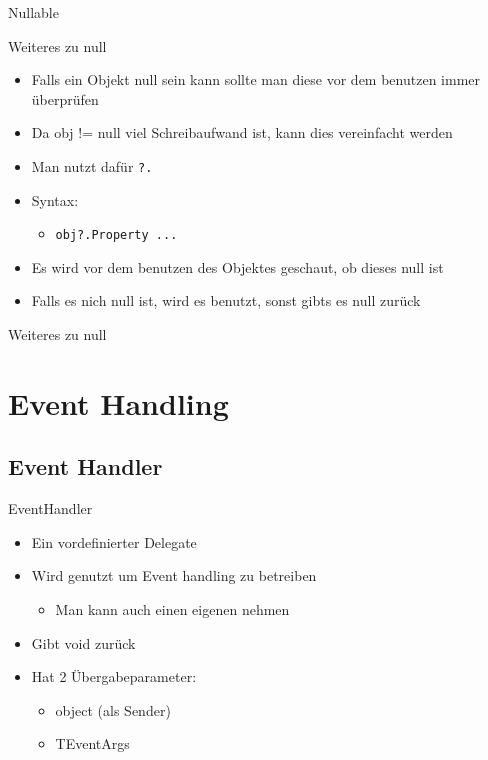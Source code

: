 \begin{frame}{Nullable}
		
\end{frame}

\begin{frame}{Weiteres zu null}
	\begin{itemize}
		\item Falls ein Objekt \alert{null} sein kann sollte man diese vor dem benutzen immer überprüfen
		\item Da \alert{obj != null} viel Schreibaufwand ist, kann dies vereinfacht werden	
	\end{itemize}
	\begin{itemize}
		\item Man nutzt dafür \texttt{\alert{?.}}
		\item Syntax:
		\begin{itemize}
			\item \texttt{obj\alert{?.}Property ...}
		\end{itemize}
		\item Es wird vor dem benutzen des Objektes geschaut, ob dieses \alert{null} ist
		\item Falls es nich \alert{null} ist, wird es benutzt, sonst gibts es \alert{null} zurück
	\end{itemize}
\end{frame}

\begin{frame}{Weiteres zu null}
		
		
\end{frame}

\section{Event Handling}
\subsection{Event Handler}
\begin{frame}{EventHandler}
	\begin{itemize}
		\item Ein vordefinierter Delegate
		\item Wird genutzt um Event handling zu betreiben
		\begin{itemize}
			\item Man kann auch einen eigenen nehmen
		\end{itemize}
		\item Gibt \alert{void} zurück
		\item Hat 2 Übergabeparameter:
		\begin{itemize}
			\item \alert{object} (als Sender)
			\item \alert{TEventArgs}
		\end{itemize}
	\end{itemize}
		
\end{frame}

